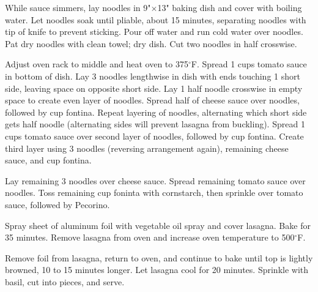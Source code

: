 \begin{recipe}
	While sauce simmers, lay noodles in 9"$\times$13" baking dish and cover with boiling water. Let noodles soak until pliable, about 15 minutes, separating noodles with tip of knife to prevent sticking. Pour off water and run cold water over noodles. Pat dry noodles with clean towel; dry dish. Cut two noodles in half crosswise.

	Adjust oven rack to middle and heat oven to 375$^{\circ}$F. Spread 1 cups tomato sauce in bottom of dish. Lay 3 noodles lengthwise in dish with ends touching 1 short side, leaving space on opposite short side. Lay 1 half noodle crosswise in empty space to create even layer of noodles. Spread half of cheese sauce over noodles, followed by  cup fontina. Repeat layering of noodles, alternating which short side gets half noodle (alternating sides will prevent lasagna from buckling). Spread 1 cups tomato sauce over second layer of noodles, followed by  cup fontina. Create third layer using 3 noodles (reversing arrangement again), remaining cheese sauce, and  cup fontina.

	Lay remaining 3 noodles over cheese sauce. Spread remaining tomato sauce over noodles. Toss remaining  cup foninta with cornstarch, then sprinkle over tomato sauce, followed by Pecorino.

	Spray sheet of aluminum foil with vegetable oil spray and cover lasagna. Bake for 35 minutes. Remove lasagna from oven and increase oven temperature to 500$^{\circ}$F.

	Remove foil from lasagna, return to oven, and continue to bake until top is lightly browned, 10 to 15 minutes longer. Let lasagna cool for 20 minutes. Sprinkle with basil, cut into pieces, and serve.



\end{recipe}
